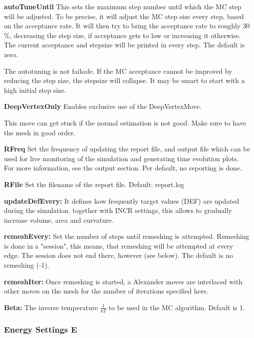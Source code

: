 \documentclass[11pt]{article}
\begin{document}
\noindent
\textbf{autoTuneUntil} This sets the maximum step number until which the MC step will be adjusted. To be precise, it will adjust the MC step size every step, based on the acceptance rate. It will then try to bring the acceptance rate to roughly 30 \%, decreasing the step size, if acceptance gets to low or increasing it otherwise. The current acceptance and stepsize will be printed in every step. The default is zero.
\noindent
\begin{tcolorbox}[colback=orange!5!white,colframe=orange!75!black,title=Clarification]
The autotuning is not failsafe. If the MC acceptance cannot be improved by reducing the step size, the stepsize will collapse. It may be smart to start with a high initial step size.
\end{tcolorbox}
\noindent
\textbf{DeepVertexOnly} Enables exclusive use of the DeepVertexMove. 
\begin{tcolorbox}[colback=orange!5!white,colframe=orange!75!black,title=Clarification]
This move can get stuck if the normal estimation is not good. Make sure to have the mesh in good order.
\end{tcolorbox}
\noindent
\textbf{RFreq}
Set the frequency of updating the report file, and output file which can be used for live monitoring of the simulation and generating time evolution plots. For more information, see the output section. Per default, no reporting is done.

\noindent
\textbf{RFile} 
Set the filename of the report file. Default: report.log

\noindent
\textbf{updateDefEvery:} It defines how frequently target values (DEF) are updated during the simulation. together with INCR settings, this allows to gradually increase volume, area and curvature.

\noindent
\textbf{remeshEvery:} Set the number of steps until remeshing is attempted. Remeshing is done in a "session", this means, that remeshing will be attempted at every edge. The session does not end there, however (see below). The default is no remeshing (-1).

\noindent
\textbf{remeshIter:} Once remeshing is started,
a Alexander moves are interlaced with other moves on the mesh for the number of iterations specified here.

\noindent
\textbf{Beta:} The inverse temperature $\frac{1}{kT}$ to be used in the MC algorithm. Default is 1.

\subsubsection{Energy Settings E}
\end{document}
